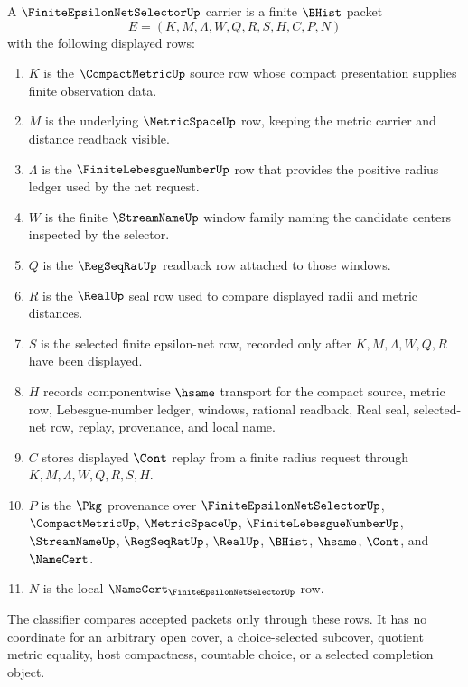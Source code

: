 \begin{definition}\label{def:finite-epsilon-net-choice-carrier}
A $\FiniteEpsilonNetSelectorUp$ carrier is a finite $\BHist$ packet
$$
E=(K,M,\Lambda,W,Q,R,S,H,C,P,N)
$$
with the following displayed rows:
\begin{enumerate}
\item $K$ is the $\CompactMetricUp$ source row whose compact presentation supplies finite observation data.
\item $M$ is the underlying $\MetricSpaceUp$ row, keeping the metric carrier and distance readback visible.
\item $\Lambda$ is the $\FiniteLebesgueNumberUp$ row that provides the positive radius ledger used by the net request.
\item $W$ is the finite $\StreamNameUp$ window family naming the candidate centers inspected by the selector.
\item $Q$ is the $\RegSeqRatUp$ readback row attached to those windows.
\item $R$ is the $\RealUp$ seal row used to compare displayed radii and metric distances.
\item $S$ is the selected finite epsilon-net row, recorded only after $K,M,\Lambda,W,Q,R$ have been displayed.
\item $H$ records componentwise $\hsame$ transport for the compact source, metric row, Lebesgue-number ledger, windows, rational readback, Real seal, selected-net row, replay, provenance, and local name.
\item $C$ stores displayed $\Cont$ replay from a finite radius request through $K,M,\Lambda,W,Q,R,S,H$.
\item $P$ is the $\Pkg$ provenance over $\FiniteEpsilonNetSelectorUp$, $\CompactMetricUp$, $\MetricSpaceUp$, $\FiniteLebesgueNumberUp$, $\StreamNameUp$, $\RegSeqRatUp$, $\RealUp$, $\BHist$, $\hsame$, $\Cont$, and $\NameCert$.
\item $N$ is the local $\NameCert_{\FiniteEpsilonNetSelectorUp}$ row.
\end{enumerate}
The classifier compares accepted packets only through these rows. It has no coordinate for an arbitrary open cover, a choice-selected subcover, quotient metric equality, host compactness, countable choice, or a selected completion object.
\end{definition}

